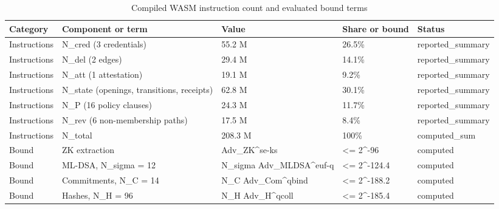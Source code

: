 \begin{table}[t]
\centering
\caption{Compiled WASM instruction count and evaluated bound terms}
\begin{tabular}{lllll}
\hline
Category & Component or term & Value & Share or bound & Status \\
\hline
Instructions & N\_cred (3 credentials) & 55.2 M & 26.5\% & reported\_summary \\
Instructions & N\_del (2 edges) & 29.4 M & 14.1\% & reported\_summary \\
Instructions & N\_att (1 attestation) & 19.1 M & 9.2\% & reported\_summary \\
Instructions & N\_state (openings, transitions, receipts) & 62.8 M & 30.1\% & reported\_summary \\
Instructions & N\_P (16 policy clauses) & 24.3 M & 11.7\% & reported\_summary \\
Instructions & N\_rev (6 non-membership paths) & 17.5 M & 8.4\% & reported\_summary \\
Instructions & N\_total & 208.3 M & 100\% & computed\_sum \\
Bound & ZK extraction & Adv\_ZK^se-ks & <= 2^-96 & computed \\
Bound & ML-DSA, N\_sigma = 12 & N\_sigma Adv\_MLDSA^euf-q & <= 2^-124.4 & computed \\
Bound & Commitments, N\_C = 14 & N\_C Adv\_Com^qbind & <= 2^-188.2 & computed \\
Bound & Hashes, N\_H = 96 & N\_H Adv\_H^qcoll & <= 2^-185.4 & computed \\
\hline
\end{tabular}
\end{table}
